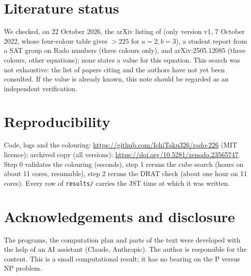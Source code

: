 \documentclass[11pt,a4paper]{article}
\theoremstyle{remark}
\begin{document}
\section{Literature status}\label{sec:lit}
We checked, on 22 October 2026, the arXiv listing of \cite{CDW22} (only version v1, 7 October 2022, whose four-colour table
gives $>225$ for $a=2,b=3$), a student report from a SAT group on Rado numbers (three colours only),
and arXiv:2505.12085 (three colours, other equations); none states a value for this equation.
This search was not exhaustive: the list of papers citing \cite{CDW22} and the authors have not yet been consulted.
If the value is already known, this note should be regarded as an independent verification.

\section{Reproducibility}
Code, logs and the colouring: \url{https://github.com/IchiTaku326/rado-226} (MIT licence); archived copy (all versions): \url{https://doi.org/10.5281/zenodo.23565747}.
Step 0 validates the colouring (seconds), step 1 reruns the cube search (hours on about 11 cores, resumable),
step 2 reruns the DRAT check (about one hour on 11 cores).
Every row of \texttt{results/} carries the JST time at which it was written.

\section*{Acknowledgements and disclosure}
The programs, the computation plan and parts of the text were developed with the help of an AI assistant (Claude, Anthropic).
The author is responsible for the content. This is a small computational result; it has no bearing on the P versus NP problem.
\end{document}
